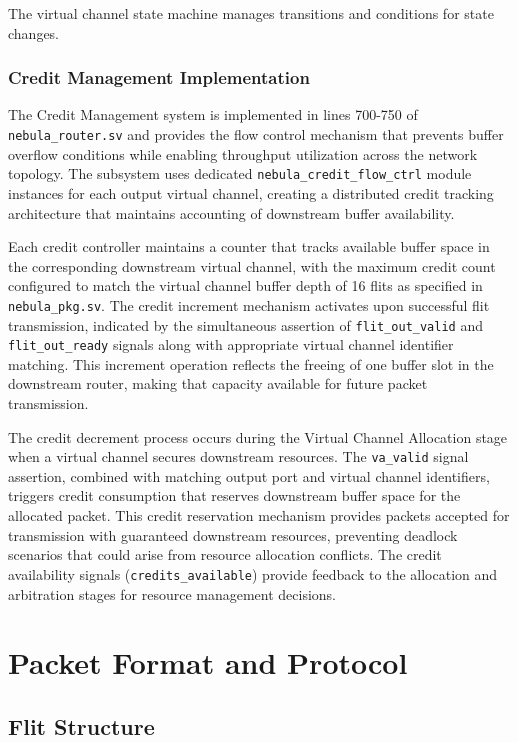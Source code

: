 \documentclass[12pt,letterpaper]{article}
\begin{document}
The virtual channel state machine manages transitions and conditions for state changes.

\subsubsection{Credit Management Implementation}

The Credit Management system is implemented in lines 700-750 of \texttt{nebula\_router.sv} and provides the flow control mechanism that prevents buffer overflow conditions while enabling throughput utilization across the network topology. The subsystem uses dedicated \texttt{nebula\_credit\_flow\_ctrl} module instances for each output virtual channel, creating a distributed credit tracking architecture that maintains accounting of downstream buffer availability.

Each credit controller maintains a counter that tracks available buffer space in the corresponding downstream virtual channel, with the maximum credit count configured to match the virtual channel buffer depth of 16 flits as specified in \texttt{nebula\_pkg.sv}. The credit increment mechanism activates upon successful flit transmission, indicated by the simultaneous assertion of \texttt{flit\_out\_valid} and \texttt{flit\_out\_ready} signals along with appropriate virtual channel identifier matching. This increment operation reflects the freeing of one buffer slot in the downstream router, making that capacity available for future packet transmission.

The credit decrement process occurs during the Virtual Channel Allocation stage when a virtual channel secures downstream resources. The \texttt{va\_valid} signal assertion, combined with matching output port and virtual channel identifiers, triggers credit consumption that reserves downstream buffer space for the allocated packet. This credit reservation mechanism provides packets accepted for transmission with guaranteed downstream resources, preventing deadlock scenarios that could arise from resource allocation conflicts. The credit availability signals (\texttt{credits\_available}) provide feedback to the allocation and arbitration stages for resource management decisions.

\section{Packet Format and Protocol}

\subsection{Flit Structure}
\end{document}
